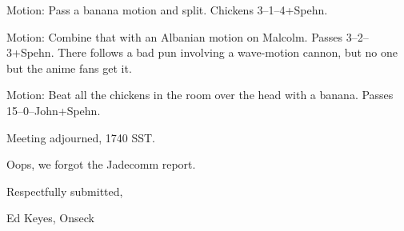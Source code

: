 \documentclass[12pt]{article}
\begin{document}
Motion: Pass a banana motion and split.  Chickens 3--1--4+Spehn.

Motion: Combine that with an Albanian motion on Malcolm.  Passes
3--2--3+Spehn.  There follows a bad pun involving a wave-motion
cannon, but no one but the anime fans get it.

Motion: Beat all the chickens in the room over the head with a
banana.  Passes 15--0--John+Spehn.

\vspace{12pt}

\noindent
Meeting adjourned, 1740 SST.

Oops, we forgot the Jadecomm report.

\vspace{18pt}

\centerline{Respectfully submitted,}
\centerline{Ed Keyes, Onseck}
\end{document}
